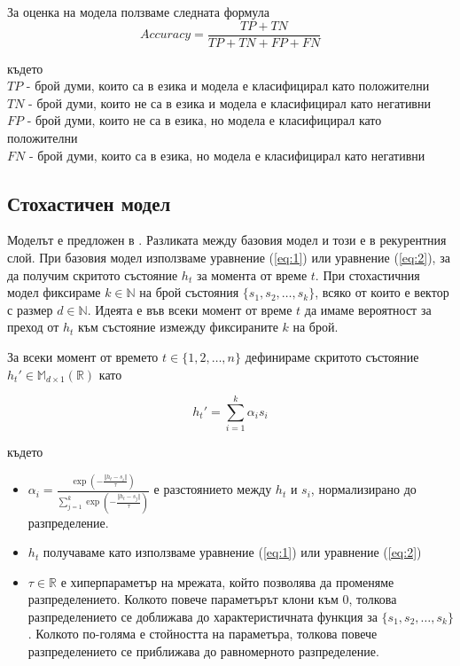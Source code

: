 \documentclass[a4paper,12pt]{article}
\begin{document}
За оценка на модела ползваме следната формула
\begin{equation} \label{eqn}
Accuracy = \frac{TP + TN}{TP + TN + FP + FN}
\end{equation}

където\\
$TP$ - брой думи, които са в езика и модела е класифицирал като положителни\\
$TN$ - брой думи, които не са в езика и модела е класифицирал като негативни\\
$FP$ - брой думи, които не са в езика, но модела е класифицирал като положителни\\
$FN$ - брой думи, които са в езика, но модела е класифицирал като негативни\\

\subsection{Стохастичен модел}

Моделът е предложен в \cite{citation06}. Разликата между базовия модел и този е в рекурентния слой. При базовия модел използваме уравнение (\ref{eq:1}) или уравнение (\ref{eq:2}), за да получим скритото състояние $h_t$ за момента от време $t$. При стохастичния модел фиксираме $k \in \mathbb{N}$ на брой състояния $\{s_1, s_2, \ldots, s_k\}$, всяко от които е вектор с размер $d \in \mathbb{N}$. Идеята е във всеки момент от време $t$ да имаме вероятност за преход от $h_t$ към състояние измежду фиксираните $k$ на брой. 

За всеки момент от времето $t \in \{1, 2, \ldots, n\}$ дефинираме скритото състояние $h_t' \in \mathbb{M}_{d \times 1} (\mathbb{R})$ като

\begin{equation}
h_t' = {\sum_{i=1}^{k} \alpha_{i} s_i}
\end{equation}

където

\begin{itemize}
 \item $\alpha_{i} = \frac{\exp \left(- \frac{\Vert{h_t - s_i}\Vert}{\tau}\right)}{\displaystyle\sum_{j=1}^{k} \exp \left(- \frac{\Vert{h_t - s_j}\Vert}{\tau}\right)}$ е разстоянието между $h_t$ и $s_i$, нормализирано до разпределение.
 \item $h_t$ получаваме като използваме уравнение (\ref{eq:1}) или уравнение (\ref{eq:2})
 \item $\tau \in \mathbb{R}$ е хиперпараметър на мрежата, който позволява да променяме разпределението. Колкото повече параметърът клони към 0, толкова разпределението се доближава до характеристичната функция за $\{s_1, s_2, \ldots, s_k\}$. Колкото по-голяма е стойността на параметъра, толкова повече разпределението се приближава до равномерното разпределение.
\end{itemize}
\end{document}
